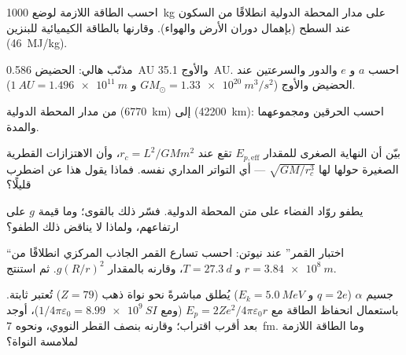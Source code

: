\begin{exercise}[$\star\star$]\label{exo:b1:central-forces:5}
احسب الطاقة اللازمة لوضع \qty{1000}{kg} على مدار المحطة الدولية انطلاقًا من
السكون عند السطح (بإهمال دوران الأرض والهواء). وقارنها
بالطاقة الكيميائية للبنزين (\qty{46}{MJ/kg}).
\end{exercise}

\begin{exercise}[$\star\star$]\label{exo:b1:central-forces:6}
مذنّب هالي: الحضيض \qty{0.586}{AU} والأوج \qty{35.1}{AU}.
احسب $a$ و $e$ والدور والسرعتين عند الحضيض والأوج
($GM_\odot = \qty{1.33e20}{m^3/s^2}$ و $\qty{1}{AU} = \qty{1.496e11}{m}$).
\end{exercise}

\begin{exercise}[$\star\star$]\label{exo:b1:central-forces:7}
 من مدار المحطة الدولية (\qty{6770}{km}) إلى
 (\qty{42200}{km}): احسب الحرقين ومجموعهما والمدة.
\end{exercise}

\begin{exercise}[$\star\star$]\label{exo:b1:central-forces:8}
بيّن أن النهاية الصغرى للمقدار $E_{p,\mathrm{eff}}$ تقع عند $r_c = L^2/GMm^2$،
وأن الاهتزازات القطرية الصغيرة حولها لها 
$\sqrt{GM/r_c^3}$ --- أي التواتر المداري نفسه. فماذا يقول هذا
عن  اضطرب قليلًا؟
\end{exercise}

\begin{exercise}[$\star\star$]\label{exo:b1:central-forces:9}
يطفو روّاد الفضاء على متن المحطة الدولية. فسّر ذلك بالقوى؛ وما
قيمة $g$ على ارتفاعهم، ولماذا لا يناقض ذلك الطفو؟
\end{exercise}

\begin{exercise}[$\star\star\star$]\label{exo:b1:central-forces:10}
``اختبار القمر'' عند نيوتن: احسب تسارع القمر الجاذب المركزي انطلاقًا من
$r = \qty{3.84e8}{m}$ و $T = \qty{27.3}{d}$، وقارنه بالمقدار
$g(R/r)^2$. ثم استنتج.
\end{exercise}

\begin{exercise}[$\star\star\star$]\label{exo:b1:central-forces:11}
جسيم $\alpha$ ($q = 2e$ و $E_k = \qty{5.0}{MeV}$) يُطلق مباشرةً
نحو نواة ذهب ($Z = 79$) تُعتبر ثابتة. باستعمال انحفاظ الطاقة
مع $E_p = 2Ze^2/4\pi\varepsilon_0r$ (ومع $1/4\pi\varepsilon_0 = \qty{8.99e9}{SI}$)،
أوجد بعد أقرب اقتراب؛ وقارنه بنصف القطر النووي،
ونحوه \qty{7}{fm}. وما الطاقة اللازمة لملامسة النواة؟
\end{exercise}

